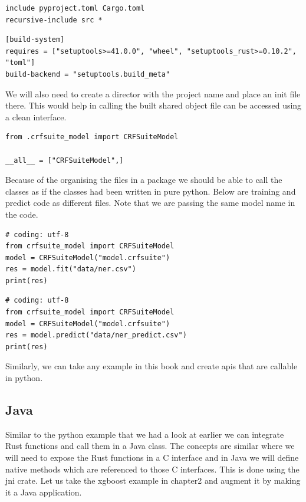\documentclass{book}
\begin{document}
\begin{lstlisting}[caption={chapter8/crfsuite\\-model/MANIFEST.in}, basicstyle=\small]
include pyproject.toml Cargo.toml
recursive-include src *
\end{lstlisting}

\begin{lstlisting}[caption={chapter8/crfsuite\\-model/pyproject.toml}, basicstyle=\small]
[build-system]
requires = ["setuptools>=41.0.0", "wheel", "setuptools_rust>=0.10.2", "toml"]
build-backend = "setuptools.build_meta"
\end{lstlisting}

We will also need to create a director with the project name and place an init file there. This would help in calling the built shared object file can be accessed using a clean interface.

\begin{lstlisting}[caption={init}, basicstyle=\small]
from .crfsuite_model import CRFSuiteModel

__all__ = ["CRFSuiteModel",]
\end{lstlisting}

Because of the organising the files in a package we should be able to call the classes as if the classes had been written in pure python. Below are training and predict code as different files. Note that we are passing the same model name in the code.

\begin{lstlisting}[caption={example training file}, basicstyle=\small]
# coding: utf-8
from crfsuite_model import CRFSuiteModel
model = CRFSuiteModel("model.crfsuite")
res = model.fit("data/ner.csv")
print(res)
\end{lstlisting}

\begin{lstlisting}[caption={example prediction file}, basicstyle=\small]
# coding: utf-8
from crfsuite_model import CRFSuiteModel
model = CRFSuiteModel("model.crfsuite")
res = model.predict("data/ner_predict.csv")
print(res)
\end{lstlisting}

Similarly, we can take any example in this book and create apis that are callable in python.

\label{sub:python}
\subsection{Java}%
Similar to the python example that we had a look at earlier we can integrate Rust functions and call them in a Java class. The concepts are similar where we will need to expose the Rust functions in a C interface and in Java we will define native methods which are referenced to those C interfaces. This is done using the jni crate. Let us take the xgboost example in chapter2 and augment it by making it a Java application.
\end{document}
